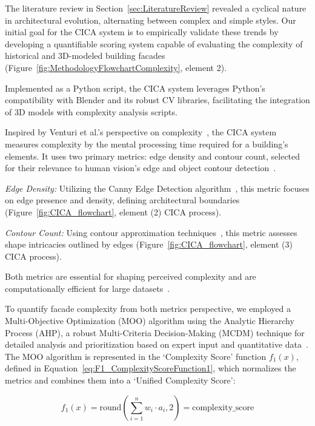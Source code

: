 
The literature review in Section~\ref{sec:LiteratureReview} revealed a cyclical nature in architectural evolution, alternating between complex and simple styles.
Our initial goal for the CICA system is to empirically validate these trends by developing a quantifiable scoring system capable of evaluating the complexity of historical and 3D-modeled building facades (Figure~\ref{fig:MethodologyFlowchartComplexity}, element 2).

Implemented as a Python script, the CICA system leverages Python's compatibility with Blender and its robust CV libraries, facilitating the integration of 3D models with complexity analysis scripts.

Inspired by Venturi et al.'s perspective on complexity~\cite{Venturi1977}, the CICA system measures complexity by the mental processing time required for a building's elements.
It uses two primary metrics: edge density and contour count, selected for their relevance to human vision's edge and object contour detection~\cite{Yang2022}.

\textit{Edge Density:} Utilizing the Canny Edge Detection algorithm~\cite{EdgeOpenCV2023}, this metric focuses on edge presence and density, defining architectural boundaries (Figure~\ref{fig:CICA_flowchart}, element (2) CICA process).

\textit{Contour Count:} Using contour approximation techniques~\cite{ContourOpenCV2023}, this metric assesses shape intricacies outlined by edges (Figure~\ref{fig:CICA_flowchart}, element (3) CICA process).

Both metrics are essential for shaping perceived complexity and are computationally efficient for large datasets~\cite{Yang2022}.

To quantify facade complexity from both metrics perspective, we employed a Multi-Objective Optimization (MOO) algorithm using the Analytic Hierarchy Process (AHP), a robust Multi-Criteria Decision-Making (MCDM) technique for detailed analysis and prioritization based on expert input and quantitative data~\cite{Taherdoost2023}.
The MOO algorithm is represented in the `Complexity Score' function \(f_1(x)\), defined in Equation~\ref{eq:F1_ComplexityScoreFunction1}, which normalizes the metrics and combines them into a `Unified Complexity Score':

\begin{equation}
    f_1(x) = \mathrm{round}\left(\sum_{i=1}^{n} w_i \cdot a_i, 2\right) = \text{complexity\_score}
    \label{eq:F1_ComplexityScoreFunction1}
\end{equation}

